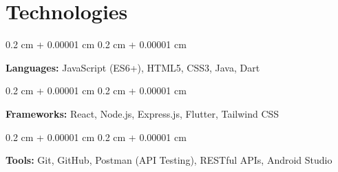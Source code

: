 \documentclass[10pt, a4paper]{article}
\newenvironment{onecolentry}{
    \begin{adjustwidth}{
        0.2 cm + 0.00001 cm
    }{
        0.2 cm + 0.00001 cm
    }
}{
    \end{adjustwidth}
} %
\begin{document}
    \section{Technologies}
    
            \begin{onecolentry}
                \textbf{Languages:} JavaScript (ES6+), HTML5, CSS3, Java, Dart
            \end{onecolentry}
            \vspace{0.1cm}
            \begin{onecolentry}
                \textbf{Frameworks:} React, Node.js, Express.js, Flutter, Tailwind CSS
            \end{onecolentry}
            \vspace{0.1 cm}
            \begin{onecolentry}
            \textbf{Tools:} Git, GitHub, Postman (API Testing), RESTful APIs, Android Studio
            \end{onecolentry}
        
\end{document}
